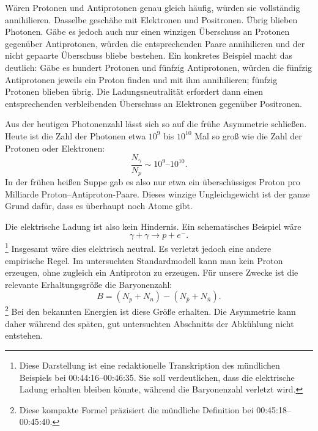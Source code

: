 Wären Protonen und Antiprotonen genau gleich häufig, würden sie vollständig annihilieren. Dasselbe geschähe mit Elektronen und Positronen. Übrig blieben Photonen. Gäbe es jedoch auch nur einen winzigen Überschuss an Protonen gegenüber Antiprotonen, würden die entsprechenden Paare annihilieren und der nicht gepaarte Überschuss bliebe bestehen. Ein konkretes Beispiel macht das deutlich: Gäbe es hundert Protonen und fünfzig Antiprotonen, würden die fünfzig Antiprotonen jeweils ein Proton finden und mit ihm annihilieren; fünfzig Protonen blieben übrig. Die Ladungsneutralität erfordert dann einen entsprechenden verbleibenden Überschuss an Elektronen gegenüber Positronen.

Aus der heutigen Photonenzahl lässt sich so auf die frühe Asymmetrie schließen. Heute ist die Zahl der Photonen etwa \(10^9\) bis \(10^{10}\) Mal so groß wie die Zahl der Protonen oder Elektronen:
\[
\frac{N_\gamma}{N_p} \sim 10^9\text{--}10^{10}.
\]
In der frühen heißen Suppe gab es also nur etwa ein überschüssiges Proton pro Milliarde Proton--Antiproton-Paare. Dieses winzige Ungleichgewicht ist der ganze Grund dafür, dass es überhaupt noch Atome gibt.

\begin{classroomqa}
\end{classroomqa}

Die elektrische Ladung ist also kein Hindernis. Ein schematisches Beispiel wäre
\[
\gamma + \gamma \to p + e^-.
\]\footnote{Diese Darstellung ist eine redaktionelle Transkription des mündlichen Beispiels bei 00:44:16--00:46:35. Sie soll verdeutlichen, dass die elektrische Ladung erhalten bleiben könnte, während die Baryonenzahl verletzt wird.}
Insgesamt wäre dies elektrisch neutral. Es verletzt jedoch eine andere empirische Regel. Im untersuchten Standardmodell kann man kein Proton erzeugen, ohne zugleich ein Antiproton zu erzeugen. Für unsere Zwecke ist die relevante Erhaltungsgröße die Baryonenzahl:
\[
B=(N_p+N_n)-(N_{\bar p}+N_{\bar n}).
\]\footnote{Diese kompakte Formel präzisiert die mündliche Definition bei 00:45:18--00:45:40.}
Bei den bekannten Energien ist diese Größe erhalten. Die Asymmetrie kann daher während des späten, gut untersuchten Abschnitts der Abkühlung nicht entstehen.

